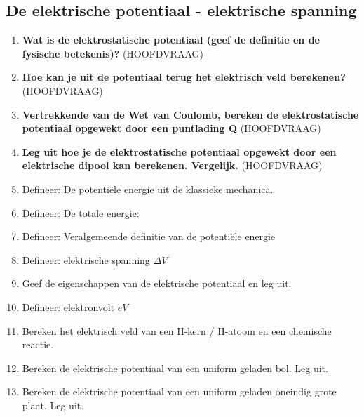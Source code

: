 \documentclass[12pt]{article}
\begin{document}
    \subsection{De elektrische potentiaal - elektrische spanning}
    \begin{enumerate}
        \item \textbf{Wat is de elektrostatische potentiaal (geef de definitie en de fysische betekenis)?} (HOOFDVRAAG)
        \item \textbf{Hoe kan je uit de potentiaal terug het elektrisch veld berekenen?} (HOOFDVRAAG)
        \item \textbf{Vertrekken­de van de Wet van Coulomb, bereken de elektrostatische potentiaal opgewekt door een punt­lading Q} (HOOFDVRAAG)
        \item \textbf{Leg uit hoe je de elektrostatische potentiaal opgewekt door een elektrische dipool kan berekenen. Vergelijk.  } (HOOFDVRAAG)
        \item Defineer: De potentiële energie uit de klassieke mechanica.
        \item Defineer: De totale energie:
        \item Defineer: Veralgemeende definitie van de potentiële energie
        \item Defineer: elektrische spanning $\Delta V$
        \item Geef de eigenschappen van de elektrische potentiaal en leg uit.
        \item Defineer: elektronvolt $eV$
        \item Bereken het elektrisch veld van een H-kern / H-atoom en een chemische reactie.
        \item Bereken de elektrische potentiaal van een uniform geladen bol. Leg uit.
        \item Bereken de elektrische potentiaal van een uniform geladen oneindig grote plaat. Leg uit.
    \end{enumerate}
\end{document}
